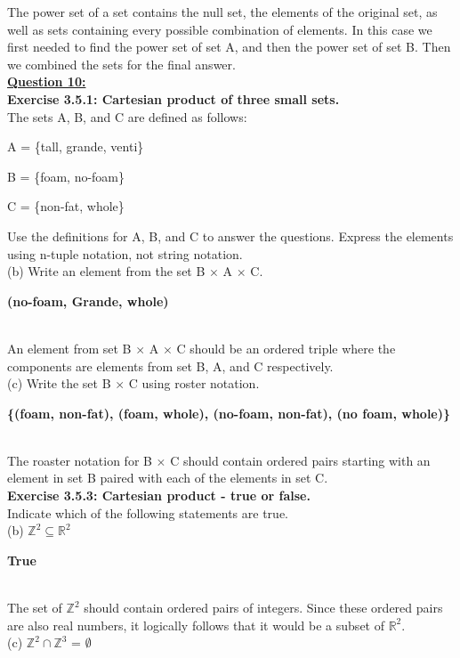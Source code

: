 \documentclass[12pt, letterpaper, twoside]{article}
\begin{document}
The power set of a set contains the null set, the elements of the original set, as well as sets containing every possible combination of elements. In this case we first needed to find the power set of set A, and then the power set of set B. Then we combined the sets for the final answer.\\
\newpage
\noindent \textbf{\underline{Question 10:}}\\
\textbf{Exercise 3.5.1: Cartesian product of three small sets.}\\
The sets A, B, and C are defined as follows:
\begin{description}[noitemsep]
\item A = \{tall, grande, venti\}
\item B = \{foam, no-foam\}
\item C = \{non-fat, whole\}
\end{description}
Use the definitions for A, B, and C to answer the questions. Express the elements using n-tuple notation, not string notation.\\
\break
(b) Write an element from the set B $\times$ A $\times$ C.\\
\break
\centerline{\textbf{(no-foam, Grande, whole)}}\\
\break
An element from set B $\times$ A $\times$ C should be an ordered triple where the components are elements from set B, A, and C respectively.\\
\break
(c) Write the set B $\times$ C using roster notation.\\
\break
\centerline{\textbf{\{(foam, non-fat), (foam, whole), (no-foam, non-fat), (no foam, whole)\}}}\\
\break
The roaster notation for B $\times$ C should contain ordered pairs starting with an element in set B paired with each of the elements in set C.\\
\break
\newpage
\noindent\textbf{Exercise 3.5.3: Cartesian product - true or false.}\\
Indicate which of the following statements are true.\\
\break
(b) $\mathbb{Z}^2 \subseteq \mathbb{R}^2$\\
\centerline{\textbf{True}}\\
The set of $\mathbb{Z}^2$ should contain ordered pairs of integers. Since these ordered pairs are also real numbers, it logically follows that it would be a subset of $\mathbb{R}^2$.\\
\break
(c) $\mathbb{Z}^2 \cap \mathbb{Z}^3$ = $\emptyset$\\
\end{document}
